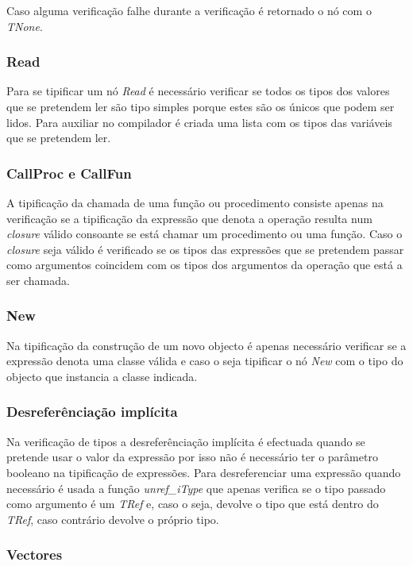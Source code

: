 Caso alguma verificação falhe durante a verificação é retornado o nó com o 
\emph{TNone}.

\subsubsection{Read}

Para se tipificar um nó \emph{Read} é necessário verificar se todos os tipos 
dos valores que se pretendem ler são tipo simples porque estes são os únicos 
que podem ser lidos. Para auxiliar no compilador é criada uma lista com os 
tipos das variáveis que se pretendem ler.

\subsubsection{CallProc e CallFun}

A tipificação da chamada de uma função ou procedimento consiste apenas na 
verificação se a tipificação da expressão que denota a operação resulta num 
\emph{closure} válido consoante se está chamar um procedimento ou uma função. 
Caso o \emph{closure} seja válido é verificado se os tipos das expressões que 
se pretendem passar como argumentos coincidem com os tipos dos argumentos da 
operação que está a ser chamada.

\subsubsection{New}

Na tipificação da construção de um novo objecto é apenas necessário verificar 
se a expressão denota uma classe válida e caso o seja tipificar o nó \emph{New} 
com o tipo do objecto que instancia a classe indicada.

\subsubsection{Desreferênciação implícita}

Na verificação de tipos a desreferênciação implícita é efectuada quando se 
pretende usar o valor da expressão por isso não é necessário ter o parâmetro 
booleano na tipificação de expressões. Para desreferenciar uma expressão quando 
necessário é usada a função \emph{unref\_iType} que apenas verifica se o tipo 
passado como argumento é um \emph{TRef} e, caso o seja, devolve o tipo que está 
dentro do \emph{TRef}, caso contrário devolve o próprio tipo.

\subsubsection{Vectores}

